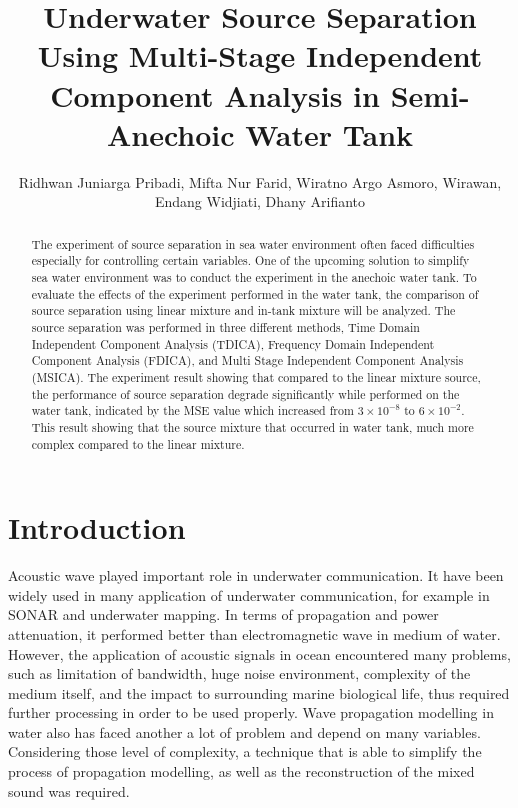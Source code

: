 \documentclass[a4paper]{jpconf}
\begin{document}
\title{Underwater Source Separation Using Multi-Stage Independent Component Analysis in Semi-Anechoic Water Tank}

\author{Ridhwan Juniarga Pribadi, Mifta Nur Farid, Wiratno Argo Asmoro, Wirawan, Endang Widjiati, Dhany Arifianto}

\address{Dept. of Engineering Physics, Faculty of Industrial Technology, Institut Teknologi Sepuluh Nopember, Kampus ITS Sukolilo, Surabaya 60111, Indonesia}


\begin{abstract}
The experiment of source separation in sea water environment often faced difficulties especially for controlling certain variables. One of the upcoming solution to simplify sea water environment was to conduct the experiment in the anechoic water tank. To evaluate the effects of the experiment performed in the water tank, the comparison of source separation using linear mixture and in-tank mixture will be analyzed. The source separation was performed in three different methods, Time Domain Independent Component Analysis (TDICA), Frequency Domain Independent Component Analysis (FDICA), and Multi Stage Independent Component Analysis (MSICA). The experiment result showing that compared to the linear mixture source, the performance of source separation degrade significantly while performed on the water tank, indicated by the MSE value which increased from $3 \times 10^{-8}$ to $6 \times 10^{-2}$. This result showing that the source mixture that occurred in water tank, much more complex compared to the linear mixture.
\end{abstract}

\section{Introduction}
Acoustic wave played important role in underwater communication. It have been widely used in many application of underwater communication, for example in SONAR and underwater mapping. In terms of propagation and power attenuation, it performed better than electromagnetic wave in medium of water. However, the application of acoustic signals in ocean encountered many problems, such as limitation of bandwidth, huge noise environment, complexity of the medium itself, and the impact to surrounding marine biological life, thus required further processing in order to be used properly. Wave propagation modelling in water also has faced another a lot of problem and depend on many variables. Considering those level of complexity, a technique that is able to simplify the process of propagation modelling, as well as the reconstruction of the mixed sound was required.
\end{document}
